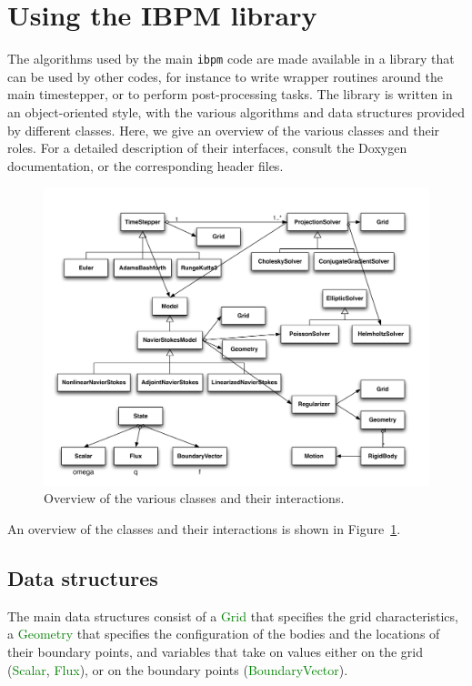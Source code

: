 \documentclass[11pt]{article}
\def\class#1{\textcolor{green}{\bf #1}}
\def\class#1{\textcolor{green}{\ttfamily\small #1}} %
\begin{document}
\section{Using the IBPM library}
\label{sec:library}

The algorithms used by the main {\tt ibpm} code are made available in a library that can be used by other codes, for instance to write wrapper routines around the main timestepper, or to perform post-processing tasks.  The library is written in an object-oriented style, with the various algorithms and data structures provided by different classes.  Here, we give an overview of the various classes and their roles.  For a detailed description of their interfaces, consult the Doxygen documentation, or the corresponding header files.

\begin{figure}
	\centering
		\includegraphics[width=\linewidth]{IBPMDesign}
	\caption{Overview of the various classes and their interactions.}
	\label{fig:classes}
\end{figure}

An overview of the classes and their interactions is shown in Figure~\ref{fig:classes}.

\subsection{Data structures}
\label{sub:data_structures}
The main data structures consist of a \class{Grid} that specifies the grid characteristics, a \class{Geometry} that specifies the configuration of the bodies and the locations of their boundary points, and variables that take on values either on the grid (\class{Scalar}, \class{Flux}), or on the boundary points (\class{BoundaryVector}).
\end{document}
